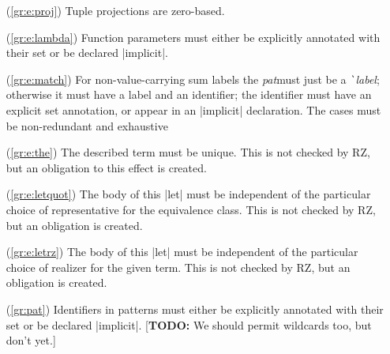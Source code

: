 \documentclass[11pt]{article}
\newcommand{\metav}[1]{\mbox{\textit{#1}}}
\newcommand{\Label}{\metav{\texttt{\`}label}}
\newcommand{\Pat}{\metav{pat}}
\newcommand{\TODO}[1]{[\textbf{TODO: }#1]}
\begin{document}
\begin{itemize}
	\item[(\ref{gr:e:proj})] Tuple projections are zero-based.
	\item[(\ref{gr:e:lambda})] Function parameters must either be explicitly annotated with their set or be declared |implicit|.
	\item[(\ref{gr:e:match})]
  For non-value-carrying
  sum labels the \Pat must just be a \Label; otherwise it must have a label and an identifier; the identifier must have an explicit set annotation, or appear in an |implicit| declaration.  The cases must be non-redundant
  and exhaustive
	\item[(\ref{gr:e:the})] The described term must be unique.  This is not checked by RZ, but an obligation to this effect is created. 
	\item[(\ref{gr:e:letquot})] The body of this |let| must be independent of the particular choice of representative for the equivalence class.  This is not checked by RZ, but an obligation is created.
	\item[(\ref{gr:e:letrz})] The body of this |let| must be independent of the particular choice of realizer for the given term.  This is not checked by RZ, but an obligation is created.
	\item[(\ref{gr:pat})] Identifiers in patterns must either be explicitly annotated with their set or be declared |implicit|.
	\TODO{We should permit wildcards too, but don't yet.}
\end{itemize}
\end{document}
